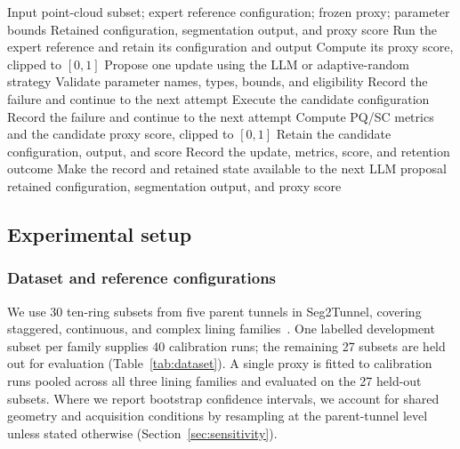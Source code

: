 \documentclass[a4paper,fleqn]{cas-dc}
\begin{document}
\begin{algorithm}[ht]
\caption{Proxy-guided parameter self-refinement}
\label{alg:reflective_adaptation}
\begin{algorithmic}[1]
\Require Input point-cloud subset; expert reference configuration; frozen proxy; parameter bounds
\Ensure Retained configuration, segmentation output, and proxy score
\State Run the expert reference and retain its configuration and output
\State Compute its proxy score, clipped to $[0,1]$
    \State Propose one update using the LLM or adaptive-random strategy
    \State Validate parameter names, types, bounds, and eligibility
        \State Record the failure and continue to the next attempt
    \EndIf
    \State Execute the candidate configuration
        \State Record the failure and continue to the next attempt
    \EndIf
    \State Compute PQ/SC metrics and the candidate proxy score, clipped to $[0,1]$
        \State Retain the candidate configuration, output, and score
    \EndIf
    \State Record the update, metrics, score, and retention outcome
    \State Make the record and retained state available to the next LLM proposal
\EndFor
\State \Return retained configuration, segmentation output, and proxy score
\end{algorithmic}
\end{algorithm}


\subsection{Experimental setup}
\label{sec:exp-setup}

\subsubsection{Dataset and reference configurations}
\label{sec:dataset}
We use 30 ten-ring subsets from five parent tunnels in Seg2Tunnel, covering staggered, continuous, and complex lining families~\cite{lin2024seg2tunnel}. One labelled development subset per family supplies 40 calibration runs; the remaining 27 subsets are held out for evaluation (Table~\ref{tab:dataset}). A single proxy is fitted to calibration runs pooled across all three lining families and evaluated on the 27 held-out subsets. Where we report bootstrap confidence intervals, we account for shared geometry and acquisition conditions by resampling at the parent-tunnel level unless stated otherwise (Section~\ref{sec:sensitivity}).
\end{document}
